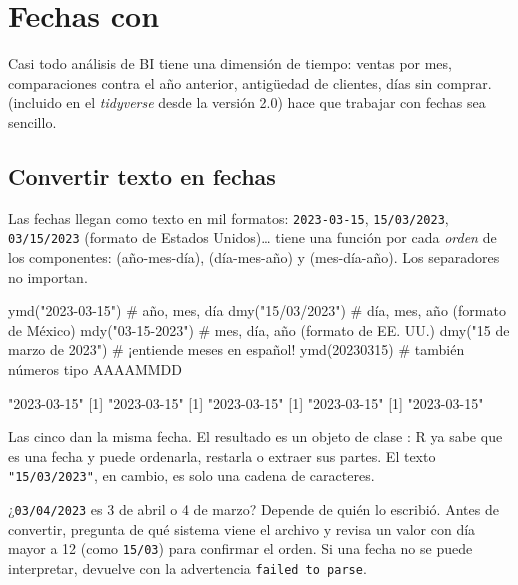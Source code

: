 \section{Fechas con \texorpdfstring{}{lubridate}}
\label{sec:m2-fechas}

Casi todo análisis de BI tiene una dimensión de tiempo: ventas por mes,
comparaciones contra el año anterior, antigüedad de clientes, días sin
comprar.  (incluido en el \emph{tidyverse} desde la
versión 2.0) hace que trabajar con fechas sea sencillo.

\subsection{Convertir texto en fechas}

Las fechas llegan como texto en mil formatos: \texttt{2023-03-15},
\texttt{15/03/2023}, \texttt{03/15/2023} (formato de Estados Unidos)\ldots{}
 tiene una función por cada \emph{orden} de los
componentes:  (año-mes-día),  (día-mes-año) y
 (mes-día-año). Los separadores no importan.

\begin{rcode}
ymd("2023-03-15")            # año, mes, día
dmy("15/03/2023")            # día, mes, año (formato de México)
mdy("03-15-2023")            # mes, día, año (formato de EE. UU.)
dmy("15 de marzo de 2023")   # ¡entiende meses en español!
ymd(20230315)                # también números tipo AAAAMMDD
\end{rcode}
\begin{rsalida}
[1] "2023-03-15"
[1] "2023-03-15"
[1] "2023-03-15"
[1] "2023-03-15"
[1] "2023-03-15"
\end{rsalida}

Las cinco dan la misma fecha. El resultado es un objeto de clase
: R ya sabe que es una fecha y puede ordenarla, restarla o
extraer sus partes. El texto \texttt{"15/03/2023"}, en cambio, es solo una
cadena de caracteres.

\begin{advertencia}
¿\texttt{03/04/2023} es 3 de abril o 4 de marzo? Depende de quién lo
escribió. Antes de convertir, pregunta de qué sistema viene el archivo y
revisa un valor con día mayor a 12 (como \texttt{15/03}) para confirmar el
orden. Si una fecha no se puede interpretar,  devuelve
 con la advertencia \texttt{failed to parse}.
\end{advertencia}


